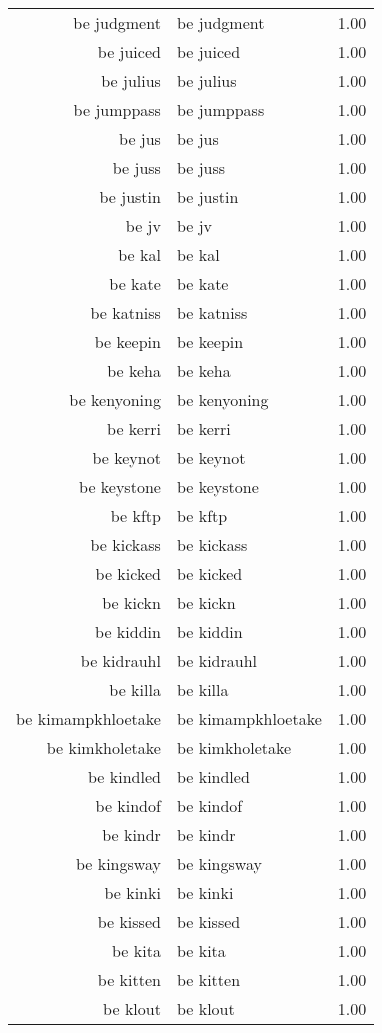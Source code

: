 \begin{table}[ht]
\begin{tabular}{rlr}
  be judgment & be judgment & 1.00 \\ 
  be juiced & be juiced & 1.00 \\ 
  be julius & be julius & 1.00 \\ 
  be jumppass & be jumppass & 1.00 \\ 
  be jus & be jus & 1.00 \\ 
  be juss & be juss & 1.00 \\ 
  be justin & be justin & 1.00 \\ 
  be jv & be jv & 1.00 \\ 
  be kal & be kal & 1.00 \\ 
  be kate & be kate & 1.00 \\ 
  be katniss & be katniss & 1.00 \\ 
  be keepin & be keepin & 1.00 \\ 
  be keha & be keha & 1.00 \\ 
  be kenyoning & be kenyoning & 1.00 \\ 
  be kerri & be kerri & 1.00 \\ 
  be keynot & be keynot & 1.00 \\ 
  be keystone & be keystone & 1.00 \\ 
  be kftp & be kftp & 1.00 \\ 
  be kickass & be kickass & 1.00 \\ 
  be kicked & be kicked & 1.00 \\ 
  be kickn & be kickn & 1.00 \\ 
  be kiddin & be kiddin & 1.00 \\ 
  be kidrauhl & be kidrauhl & 1.00 \\ 
  be killa & be killa & 1.00 \\ 
  be kimampkhloetake & be kimampkhloetake & 1.00 \\ 
  be kimkholetake & be kimkholetake & 1.00 \\ 
  be kindled & be kindled & 1.00 \\ 
  be kindof & be kindof & 1.00 \\ 
  be kindr & be kindr & 1.00 \\ 
  be kingsway & be kingsway & 1.00 \\ 
  be kinki & be kinki & 1.00 \\ 
  be kissed & be kissed & 1.00 \\ 
  be kita & be kita & 1.00 \\ 
  be kitten & be kitten & 1.00 \\ 
  be klout & be klout & 1.00 \\ 

\end{tabular}
\end{table}
